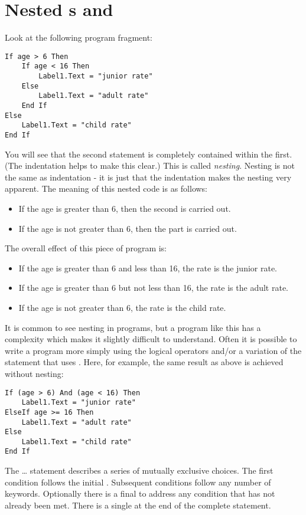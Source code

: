	\section{Nested s and }
		Look at the following program fragment:
		\begin{lstlisting}
If age > 6 Then
	If age < 16 Then
		Label1.Text = "junior rate"
	Else
		Label1.Text = "adult rate"
	End If
Else
	Label1.Text = "child rate"
End If
		\end{lstlisting}
		You will see that the second  statement is completely contained within the first. (The indentation helps to make this clear.) This is called \emph{nesting}. Nesting is not the same as indentation - it is just that the indentation makes the nesting very apparent. The meaning of this nested code is as follows:
		\begin{itemize}
			\item If the age is greater than 6, then the second  is carried out.
			\item If the age is not greater than 6, then the  part is carried out.
		\end{itemize}
		The overall effect of this piece of program is:
		\begin{itemize}
			\item If the age is greater than 6 and less than 16, the rate is the junior rate.
			\item If the age is greater than 6 but not less than 16, the rate is the adult rate.
			\item If the age is not greater than 6, the rate is the child rate.
		\end{itemize}
		It is common to see nesting in programs, but a program like this has a complexity which makes it slightly difficult to understand. Often it is possible to write a program more simply using the logical operators and/or a variation of the  statement that uses . Here, for example, the same result as above is achieved without nesting:
		\begin{lstlisting}
If (age > 6) And (age < 16) Then
	Label1.Text = "junior rate"
ElseIf age >= 16 Then
	Label1.Text = "adult rate"
Else
	Label1.Text = "child rate"
End If
		\end{lstlisting}
		The … statement describes a series of mutually exclusive choices. The first condition follows the initial . Subsequent conditions follow any number of  keywords. Optionally there is a final  to address any condition that has not already been met. There is a single  at the end of the complete statement.

